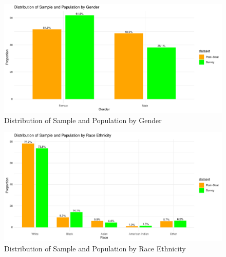 \documentclass[
  letterpaper,
  DIV=11,
  numbers=noendperiod]{scrartcl}
\begin{document}
\begin{figure}

{\centering \includegraphics{paper_files/figure-pdf/fig-distribution-by-gender-1.pdf}

}

\caption{\label{fig-distribution-by-gender}Distribution of Sample and
Population by Gender}

\end{figure}

\begin{figure}

{\centering \includegraphics{paper_files/figure-pdf/fig-distribution-by-race-1.pdf}

}

\caption{\label{fig-distribution-by-race}Distribution of Sample and
Population by Race Ethnicity}

\end{figure}
\end{document}
